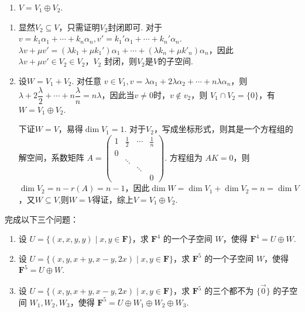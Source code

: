 \begin{exercise}
\begin{exgroup}
\begin{enumerate}
            \item $V=V_1\oplus V_2$.
        \end{enumerate}

        \begin{answer}
            \begin{enumerate}
                \item 显然$V_2\subseteq V$，只需证明$V_2$封闭即可. 对于$v=k_1\alpha_1+\cdots+k_n\alpha_n,v'=k_1'\alpha_1+\cdots+k_n'\alpha_n$. $\lambda v+\mu v'=(\lambda k_1+\mu k_1')\alpha_1+\cdots+(\lambda k_n+\mu k'_n)\alpha_n$，因此  $\lambda v+\mu v'\in V_2\in V_2$，$V_2$ 封闭，则$V_2$是$V$的子空间.

                \item 设$W=V_1+V_2$. 对任意 $v\in V_1,v=\lambda \alpha_1+2\lambda\alpha_2+\cdots+n\lambda\alpha_n$，则 $\lambda+2\dfrac{\lambda}2+\allowbreak\cdots+n\dfrac{\lambda}n=n\lambda$，因此当$v\ne 0$时，$v\not\in v_2$，则 $V_1\cap V_2=\{0\}$，有$W=V_1\oplus V_2$.

                      下证$W=V$，易得$\dim V_1=1$. 对于$V_2$，写成坐标形式，则其是一个方程组的解空间，系数矩阵 $A=\begin{pmatrix}
                              1 & \frac 12 & \cdots & \frac 1n \\
                              0 &          &        &          \\
                                & \ddots   &        &          \\
                                &          & \ddots &          \\
                                &          &        & 0
                          \end{pmatrix}$. 方程组为 $AK=0$，则 $\dim V_2=n-r(A)=n-1$，因此$\dim W=\dim V_1+\dim V_2=n=\dim V$，又$W\subseteq V$,则$W=V$得证，综上$V=V_1\oplus V_2$.
            \end{enumerate}
        \end{answer}

        \item 完成以下三个问题：
        \begin{enumerate}
            \item 设 $U = \{(x,x,y,y) \mid x,y\in \mathbf{F}\}$，求 $\mathbf{F}^4$ 的一个子空间 $W$，使得 $\mathbf{F}^4 = U \oplus W$.
            \item 设 $U = \{(x,y,x+y,x-y,2x) \mid x,y\in \mathbf{F}\}$，求 $\mathbf{F}^5$ 的一个子空间 $W$，使得 $\mathbf{F}^5 = U \oplus W$.
            \item 设 $U = \{(x,y,x+y,x-y,2x) \mid x,y\in \mathbf{F}\}$，求 $\mathbf{F}^5$ 的三个都不为 $\{\vec{0}\}$ 的子空间 $W_1,W_2,W_3$，使得 $\mathbf{F}^5 = U \oplus W_1 \oplus W_2 \oplus W_3$.
        \end{enumerate}
        \begin{answer}


\end{answer}
\end{exgroup}
\end{exercise}

